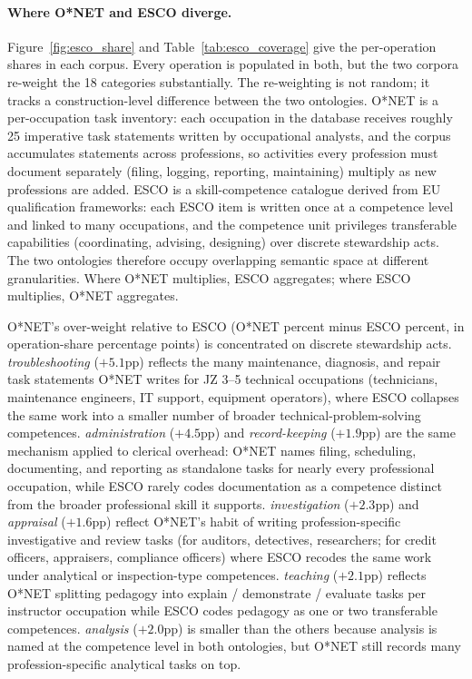 \documentclass{article}
\begin{document}
\paragraph{Where O{*}NET and ESCO diverge.} Figure~\ref{fig:esco_share} and Table~\ref{tab:esco_coverage} give the per-operation shares in each corpus.
Every operation is populated in both, but the two corpora re-weight the 18 categories substantially.
The re-weighting is not random; it tracks a construction-level difference between the two ontologies.
O{*}NET is a per-occupation task inventory: each occupation in the database receives roughly 25 imperative task statements written by occupational analysts, and the corpus accumulates statements across professions, so activities every profession must document separately (filing, logging, reporting, maintaining) multiply as new professions are added.
ESCO is a skill-competence catalogue derived from EU qualification frameworks: each ESCO item is written once at a competence level and linked to many occupations, and the competence unit privileges transferable capabilities (coordinating, advising, designing) over discrete stewardship acts.
The two ontologies therefore occupy overlapping semantic space at different granularities.
Where O{*}NET multiplies, ESCO aggregates; where ESCO multiplies, O{*}NET aggregates.

O{*}NET's over-weight relative to ESCO (O{*}NET percent minus ESCO percent, in operation-share percentage points) is concentrated on discrete stewardship acts.
\emph{troubleshooting} ($+5.1$pp) reflects the many maintenance, diagnosis, and repair task statements O{*}NET writes for JZ 3--5 technical occupations (technicians, maintenance engineers, IT support, equipment operators), where ESCO collapses the same work into a smaller number of broader technical-problem-solving competences.
\emph{administration} ($+4.5$pp) and \emph{record-keeping} ($+1.9$pp) are the same mechanism applied to clerical overhead: O{*}NET names filing, scheduling, documenting, and reporting as standalone tasks for nearly every professional occupation, while ESCO rarely codes documentation as a competence distinct from the broader professional skill it supports.
\emph{investigation} ($+2.3$pp) and \emph{appraisal} ($+1.6$pp) reflect O{*}NET's habit of writing profession-specific investigative and review tasks (for auditors, detectives, researchers; for credit officers, appraisers, compliance officers) where ESCO recodes the same work under analytical or inspection-type competences.
\emph{teaching} ($+2.1$pp) reflects O{*}NET splitting pedagogy into explain / demonstrate / evaluate tasks per instructor occupation while ESCO codes pedagogy as one or two transferable competences.
\emph{analysis} ($+2.0$pp) is smaller than the others because analysis is named at the competence level in both ontologies, but O{*}NET still records many profession-specific analytical tasks on top.
\end{document}
